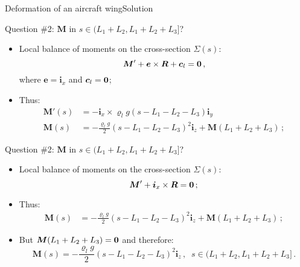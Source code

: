 \documentclass{beamer}
\newcommand{\cj}{c}
\newcommand{\cv}{{\boldsymbol\cj}}
\newcommand{\xj}{x}
\newcommand{\yj}{y}
\newcommand{\zj}{z}
\newcommand{\ej}{e}
\renewcommand{\ij}{i}
\newcommand{\ev}{{\boldsymbol\ej}}
\newcommand{\iv}{{\boldsymbol\ij}}
\newcommand{\roi}{\varrho}
\newcommand{\Fresj}{R}
\newcommand{\Mresj}{M}
\newcommand{\Fres}{{\boldsymbol\Fresj}}
\newcommand{\Mres}{{\boldsymbol\Mresj}}
\newcommand{\bzero}{{\bf 0}}
\begin{document}
\begin{frame}{Deformation of an aircraft wing}{Solution}
\begin{overprint}
\vskip-20pt
\begin{exampleblock}{Question \#2: $\Mres$ in $s\in(L_1+L_2,L_1+L_2+L_3]$?}
\begin{itemize}
\item Local balance of moments on the cross-section $\Sigma(s)$:
\begin{displaymath}
\Mres'+\ev\times\Fres+\cv_l=\bzero\,,
\end{displaymath}
where $\ev=\iv_\xj$ and $\cv_l=\bzero$;
\item Thus:
\begin{displaymath}
\begin{split}
\!\!\!\!\Mres'(s) &=-\iv_\xj\times\roi_l g(s-L_1-L_2-L_3)\iv_\yj \\
\!\!\!\!\Mres(s) &=-\frac{\roi_l g}{2}(s-L_1-L_2-L_3)^2\iv_\zj +\Mres(L_1+L_2+L_3)\,;
\end{split}
\end{displaymath}
\end{itemize}
\end{exampleblock}

\vskip-20pt
\begin{exampleblock}{Question \#2: $\Mres$ in $s\in(L_1+L_2,L_1+L_2+L_3]$?}
\begin{itemize}
\item Local balance of moments on the cross-section $\Sigma(s)$:
\begin{displaymath}
\Mres'+\iv_\xj\times\Fres=\bzero\,;
\end{displaymath}
\item Thus:
\begin{displaymath}
\begin{split}
\!\!\!\!\Mres(s) &=-\frac{\roi_l g}{2}(s-L_1-L_2-L_3)^2\iv_\zj +\Mres(L_1+L_2+L_3)\,;
\end{split}
\end{displaymath}
\item  But $\Mres(L_1+L_2+L_3)=\bzero$ and therefore:
\begin{displaymath}
\!\!\!\!\!\!\!\!\!\!\!\!\Mres(s)=-\frac{\roi_l g}{2}(s-L_1-L_2-L_3)^2\iv_\zj\,,\;\;s\in(L_1+L_2,L_1+L_2+L_3]\,.
\end{displaymath}
\end{itemize}
\end{exampleblock}


\end{overprint}
\end{frame}
\end{document}
